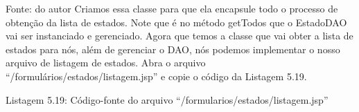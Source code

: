 Fonte: do autor
Criamos essa classe para que ela encapsule todo o processo de obtenção da lista de estados. Note que é no método getTodos que o EstadoDAO vai ser instanciado e gerenciado.
Agora que temos a classe que vai obter a lista de estados para nós, além de gerenciar o DAO, nós podemos implementar o nosso arquivo de listagem de estados. Abra o arquivo ``/formulários/estados/listagem.jsp'' e copie o código da Listagem 5.19.























Listagem 5.19: Código-fonte do arquivo ``/formularios/estados/listagem.jsp''
 
